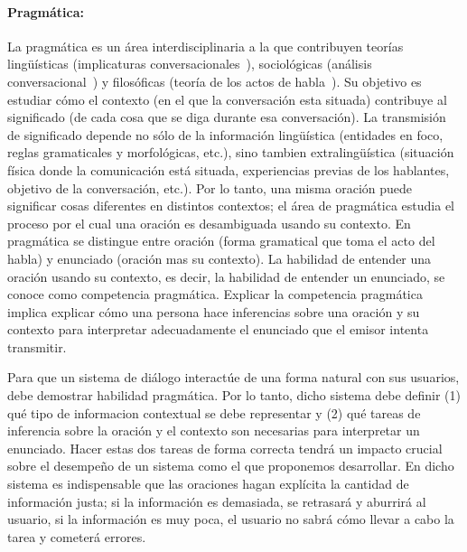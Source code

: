 \paragraph{Pragm\'atica:} La pragm\'atica es un \'area interdisciplinaria a
la que contribuyen teor\'ias ling\"u\'isticas (implicaturas
conversacionales~\citep{grice75}), sociol\'ogicas (an\'alisis
conversa\-cio\-nal~\citep{schegloff87b}) y filos\'oficas (teor\'ia de los actos
de habla~\citep{austin62}). Su objetivo es estudiar c\'omo el contexto (en el
que la conversaci\'on esta situada) contribuye al significado (de cada cosa que
se diga durante esa conversaci\'on). La transmisi\'on de significado depende no
s\'olo de la informaci\'on ling\"u\'istica (entidades en foco, reglas
gramaticales y morfol\'ogicas, etc.), sino tambien extraling\"u\'istica
(situaci\'on f\'isica donde la comunicaci\'on est\'a situada, experiencias
previas de los hablantes, objetivo de la conversaci\'on, etc.). Por lo tanto,
una misma oraci\'on puede significar cosas diferentes en distintos contextos; el
\'area de pragm\'atica estudia el proceso por el cual una oraci\'on es
desambiguada usando su contexto. En pragm\'atica se distingue entre oraci\'on
(forma gramatical que toma el acto del habla) y enunciado (oraci\'on mas su
contexto). La habilidad de entender una oraci\'on usando su contexto, es decir,
la habilidad de entender un enunciado, se conoce como competencia pragm\'atica.
Explicar la competencia pragm\'atica implica explicar c\'omo una persona hace
inferencias sobre una oraci\'on y su contexto para interpretar adecuadamente el
enunciado que el emisor intenta transmitir. 

Para que un sistema de di\'alogo interact\'ue de una forma natural con sus
usuarios, debe demostrar habilidad pragm\'atica. Por lo tanto, dicho sistema
debe definir (1) qu\'e tipo de informacion contextual se debe representar y (2)
qu\'e tareas de inferencia sobre la oraci\'on y el contexto son necesarias para
interpretar un enunciado. Hacer estas dos tareas de forma correcta tendr\'a un
impacto crucial sobre el desempe\~no de un sistema como el que proponemos
desarrollar. En dicho sistema es indispensable que las oraciones hagan
expl\'icita la cantidad de informaci\'on justa; si la informaci\'on es
demasiada, se retrasar\'a y aburrir\'a al usuario, si la informaci\'on es muy
poca, el usuario no sabr\'a c\'omo llevar a cabo la tarea y cometer\'a errores. 

%
%

